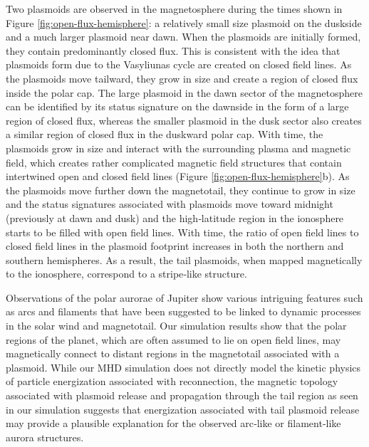 Two plasmoids are observed in the magnetosphere during the times shown in Figure \ref{fig:open-flux-hemisphere}: a relatively small size plasmoid on the duskside and a much larger plasmoid near dawn. When the plasmoids are initially formed, they contain predominantly closed flux. This is consistent with the idea that plasmoids form due to the Vasyliunas cycle are created on closed field lines. As the plasmoids move tailward, they grow in size and create a region of closed flux inside the polar cap. The large plasmoid in the dawn sector of the magnetosphere can be identified by its status signature on the dawnside in the form of a large region of closed flux, whereas the smaller plasmoid in the dusk sector also creates a similar region of closed flux in the duskward polar cap. With time, the plasmoids grow in size and interact with the surrounding plasma and magnetic field, which creates rather complicated magnetic field structures that contain intertwined open and closed field lines (Figure \ref{fig:open-flux-hemisphere}b). As the plasmoids move further down the magnetotail, they continue to grow in size and the status signatures associated with plasmoids move toward midnight (previously at dawn and dusk) and the high‐latitude region in the ionosphere starts to be filled with open field lines. With time, the ratio of open field lines to closed field lines in the plasmoid footprint increases in both the northern and southern hemispheres. As a result, the tail plasmoids, when mapped magnetically to the ionosphere, correspond to a stripe‐like structure. 

Observations of the polar aurorae of Jupiter show various intriguing features such as arcs and filaments \cite{Grodent2003a,McComas2007,Nichols2009a} that have been suggested to be linked to dynamic processes in the solar wind and magnetotail. Our simulation results show that the polar regions of the planet, which are often assumed to lie on open field lines, may magnetically connect to distant regions in the magnetotail associated with a plasmoid. While our MHD simulation does not directly model the kinetic physics of particle energization associated with reconnection, the magnetic topology associated with plasmoid release and propagation through the tail region as seen in our simulation suggests that energization associated with tail plasmoid release may provide a plausible explanation for the observed arc‐like or filament‐like aurora structures. 

